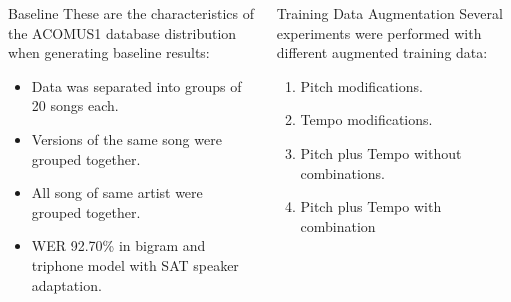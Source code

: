 \documentclass[final]{beamer}
\newlength{\onecolwid}
\newlength{\twocolwid}
\begin{document}
\begin{frame}[t]
\begin{columns}[t]
\begin{column}{\twocolwid}
\begin{columns}[t,totalwidth=\twocolwid] %
   
    
\begin{column}{\onecolwid}\vspace{-.6in} %
\begin{block}{Baseline}
    These are the characteristics of the ACOMUS1 database distribution when generating baseline results: 
\begin{itemize}
    \item Data was separated into groups of 20 songs each. 
    \item Versions of the same song were grouped together.
    \item All song of same artist were grouped together.
    \item WER 92.70\% in bigram and triphone model with SAT speaker adaptation.
\end{itemize}

\end{block}
\end{column}
\begin{column}{\onecolwid}\vspace{-.6in}
\begin{block}{Training Data Augmentation}
    Several experiments were performed with different augmented training  data:
    \begin{enumerate}
        \item Pitch modifications.
        \item Tempo modifications.
        \item Pitch plus Tempo without combinations.
        \item Pitch plus Tempo with combination
    \end{enumerate}
\end{block}

\end{column}
\end{columns}




\end{column}
\end{columns}
\end{frame}
\end{document}
